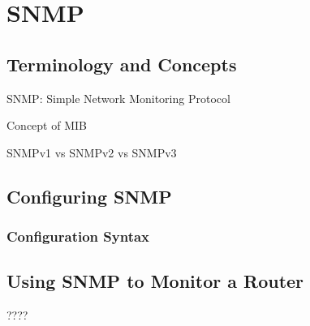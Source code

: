 \chapter{SNMP}

\section{Terminology and Concepts}

SNMP: Simple Network Monitoring Protocol

Concept of MIB

SNMPv1 vs SNMPv2 vs SNMPv3

\section{Configuring SNMP}

\subsection{Configuration Syntax}
\vspace{0.1in}
\noindent{}
\vspace{0.1in}

\section{Using SNMP to Monitor a Router}

????
